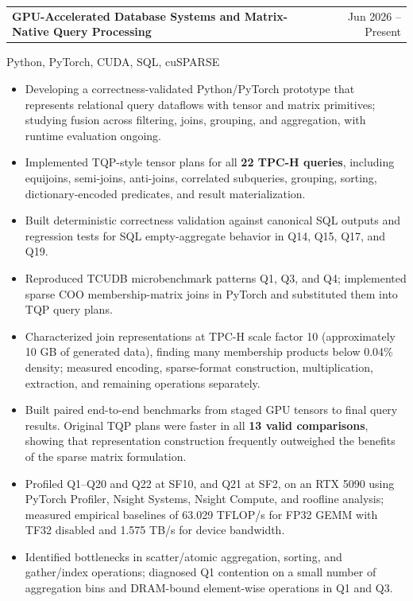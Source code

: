 \documentclass[11pt]{article}
\makeatletter
\newcommand{\resumeentry}[3]{%
  \par\addvspace{6pt}%
  \begin{tabularx}{\linewidth}{@{}>{\raggedright\arraybackslash}X@{\hspace{1em}}r@{}}%
    \textbf{#1} & {\small #2}\\%
  \end{tabularx}\par\nobreak%
  {\small #3\par}\nobreak\nopagebreak[4]%
}
\makeatother
\begin{document}
\resumeentry{GPU-Accelerated Database Systems and Matrix-Native Query Processing}
  {Jun 2026 -- Present}
  {Python, PyTorch, CUDA, SQL, cuSPARSE}
\begin{itemize}
  \item Developing a correctness-validated Python/PyTorch prototype that represents relational query dataflows with tensor and matrix primitives; studying fusion across filtering, joins, grouping, and aggregation, with runtime evaluation ongoing.
  \item Implemented TQP-style tensor plans for all \textbf{22 TPC-H queries}, including equijoins, semi-joins, anti-joins, correlated subqueries, grouping, sorting, dictionary-encoded predicates, and result materialization.
  \item Built deterministic correctness validation against canonical SQL outputs and regression tests for SQL empty-aggregate behavior in Q14, Q15, Q17, and Q19.
  \item Reproduced TCUDB microbenchmark patterns Q1, Q3, and Q4; implemented sparse COO membership-matrix joins in PyTorch and substituted them into TQP query plans.
  \item Characterized join representations at TPC-H scale factor 10 (approximately 10 GB of generated data), finding many membership products below 0.04\% density; measured encoding, sparse-format construction, multiplication, extraction, and remaining operations separately.
  \item Built paired end-to-end benchmarks from staged GPU tensors to final query results. Original TQP plans were faster in all \textbf{13 valid comparisons}, showing that representation construction frequently outweighed the benefits of the sparse matrix formulation.
  \item Profiled Q1--Q20 and Q22 at SF10, and Q21 at SF2, on an RTX 5090 using PyTorch Profiler, Nsight Systems, Nsight Compute, and roofline analysis; measured empirical baselines of 63.029 TFLOP/s for FP32 GEMM with TF32 disabled and 1.575 TB/s for device bandwidth.
  \item Identified bottlenecks in scatter/atomic aggregation, sorting, and gather/index operations; diagnosed Q1 contention on a small number of aggregation bins and DRAM-bound element-wise operations in Q1 and Q3.
\end{itemize}
\end{document}
